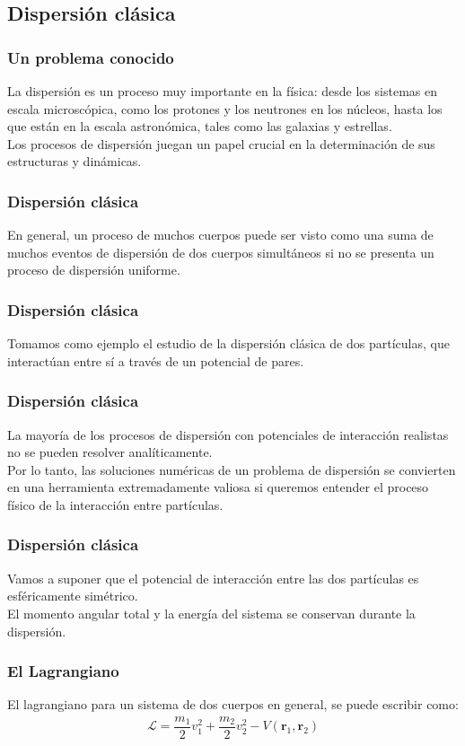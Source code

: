 \subsection{Dispersión clásica}
\begin{frame}
\frametitle{Un problema conocido}
La dispersión es un proceso muy importante en la física: desde los sistemas en escala microscópica, como los protones y los neutrones en los núcleos, hasta los que están en la escala astronómica, tales como las galaxias y estrellas.
\\
\bigskip
Los procesos de dispersión juegan un papel crucial en la determinación de sus estructuras y dinámicas.
\end{frame}
\begin{frame}
\frametitle{Dispersión clásica}
En general, un proceso de muchos cuerpos puede ser visto como una suma de muchos eventos de dispersión de dos cuerpos simultáneos si no se presenta un proceso de dispersión uniforme.
\end{frame}
\begin{frame}
\frametitle{Dispersión clásica}
Tomamos como ejemplo el estudio de la dispersión clásica de dos partículas, que interactúan entre sí a través de un potencial de pares. 
\end{frame}
\begin{frame}
\frametitle{Dispersión clásica}
La mayoría de los procesos de dispersión con potenciales de interacción realistas no se pueden resolver analíticamente. 
\\
\bigskip
Por lo tanto, las soluciones numéricas de un problema de dispersión se convierten en una herramienta extremadamente valiosa si queremos entender el proceso físico de la interacción entre partículas.
\end{frame}
\begin{frame}
\frametitle{Dispersión clásica}
Vamos a suponer que el potencial de interacción entre las dos partículas es esféricamente
simétrico.
\\
\bigskip
El momento angular total y la energía del sistema se conservan durante la dispersión.
\end{frame}
\begin{frame}
\frametitle{El Lagrangiano}
El lagrangiano para un sistema de dos cuerpos en general, se puede escribir como:
\begin{align*}
\mathcal{L} = \dfrac{m_{1}}{2} v_{1}^{2} + \dfrac{m_{2}}{2} v_{2}^{2} - V(\mathbf{r}_{1}, \mathbf{r}_2)
\end{align*}
\end{frame}
